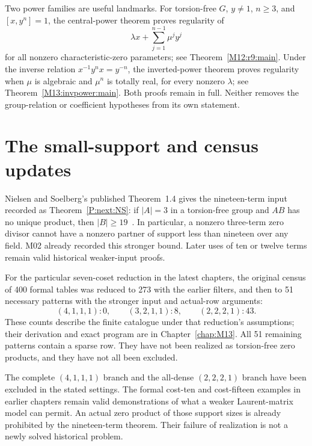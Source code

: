 \documentclass[11pt,a4paper,oneside]{report}
\theoremstyle{definition}
\theoremstyle{remark}
\begin{document}
Two power families are useful landmarks. For torsion-free $G$,
$y\ne1$, $n\ge3$, and $[x,y^n]=1$, the central-power theorem
proves regularity of
\[
  \lambda x+\sum_{j=1}^{n-1}\mu^j y^j
\]
for all nonzero characteristic-zero parameters;
see Theorem~\ref{M12:r9:main}. Under the inverse relation
$x^{-1}y^n x=y^{-n}$, the inverted-power theorem proves regularity
when $\mu$ is algebraic and $\mu^n$ is totally real, for every
nonzero $\lambda$; see Theorem~\ref{M13:invpower:main}.
Both proofs remain in full. Neither removes the group-relation
or coefficient hypotheses from its own statement.

\section{The small-support and census updates}
Nielsen and Soelberg's published Theorem~1.4 gives the
nineteen-term input recorded as Theorem~\ref{P:next:NS}:
if $|A|=3$ in a torsion-free group and $AB$ has no unique
product, then $|B|\ge19$~\cite{B:NS}. In particular, a nonzero
three-term zero divisor cannot have a nonzero partner of support
less than nineteen over any field. M02 already recorded this
stronger bound. Later uses of ten or twelve terms remain valid
historical weaker-input proofs.

For the particular seven-coset reduction in the latest chapters,
the original census of 400 formal tables was reduced to 273
with the earlier filters, and then to 51 necessary patterns
with the stronger input and actual-row arguments:
\[
 (4,1,1,1):0,\qquad (3,2,1,1):8,\qquad (2,2,2,1):43.
\]
These counts describe the finite catalogue under that reduction's
assumptions; their derivation and exact program are in
Chapter~\ref{chap:M13}. All 51 remaining patterns contain a
sparse row. They have not been realized as torsion-free zero
products, and they have not all been excluded.

The complete $(4,1,1,1)$ branch and the all-dense $(2,2,2,1)$
branch have been excluded in the stated settings. The formal
cost-ten and cost-fifteen examples in earlier chapters remain
valid demonstrations of what a weaker Laurent-matrix model can
permit. An actual zero product of those support sizes is
already prohibited by the nineteen-term theorem. Their failure
of realization is not a newly solved historical problem.
\end{document}
